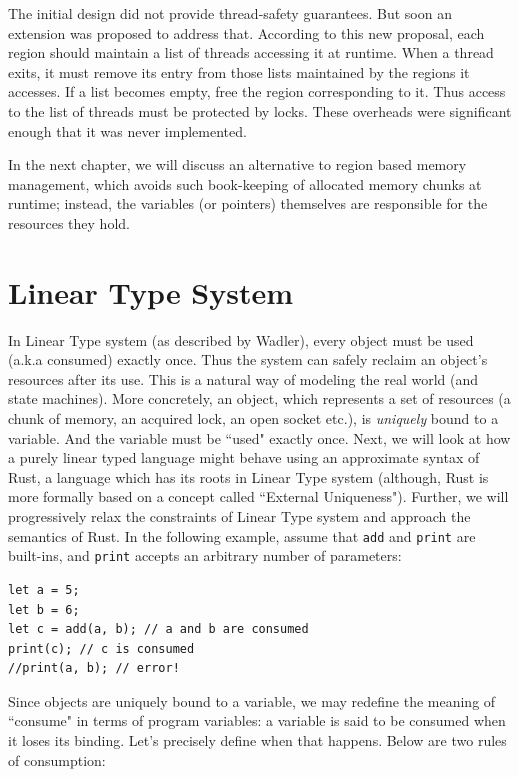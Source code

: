 \documentclass[11pt]{report}
\begin{document}
The initial design did not provide thread-safety guarantees. But soon an extension was proposed\cite{grossmanthread} to address that. According to this new proposal, each region should maintain a list of threads accessing it at runtime. When a thread exits, it must remove its entry from those lists maintained by the regions it accesses. If a list becomes empty, free the region corresponding to it. Thus access to the list of threads must be protected by locks. These overheads were significant enough that it was never implemented.

In the next chapter, we will discuss an alternative to region based memory management, which avoids such book-keeping of allocated memory chunks at runtime; instead, the variables (or pointers) themselves are responsible for the resources they hold.

\chapter{Linear Type System}

In Linear Type system (as described by Wadler\cite{linearchange}), every object must be used (a.k.a consumed) exactly once. Thus the system can safely reclaim an object's resources after its use. This is a natural way of modeling the real world (and state machines). More concretely, an object, which represents a set of resources (a chunk of memory, an acquired lock, an open socket etc.), is \textit{uniquely} bound to a variable. And the variable must be ``used" exactly once. Next, we will look at how a purely linear typed language might behave using an approximate syntax of Rust, a language which has its roots in Linear Type system (although, Rust is more formally based on a concept called ``External Uniqueness"\cite{externuniq}). Further, we will progressively relax the constraints of Linear Type system and approach the semantics of Rust. In the following example, assume that \texttt{add} and \texttt{print} are built-ins, and \texttt{print} accepts an arbitrary number of parameters:

\begin{lstlisting}
let a = 5;
let b = 6;
let c = add(a, b); // a and b are consumed
print(c); // c is consumed
//print(a, b); // error!
\end{lstlisting}

Since objects are uniquely bound to a variable, we may redefine the meaning of ``consume" in terms of program variables: a variable is said to be consumed when it loses its binding. Let's precisely define when that happens. Below are two rules of consumption:
\end{document}
